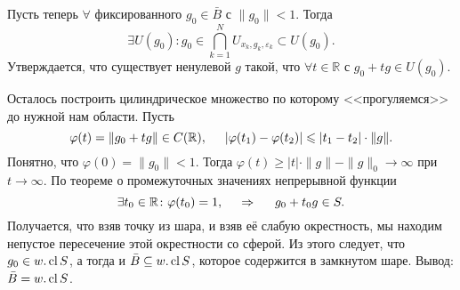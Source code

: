 Пусть теперь $\forall$ фиксированного $g_0 \in \bar{B}$ с $\|g_0\|<1$. Тогда 
\begin{equation*}
    \exists U(g_0) \colon  g_0 \in \bigcap_{k=1}^N U_{x_k, g_k, \varepsilon_k} \subset U(g_0).
\end{equation*}
Утверждается, что существует ненулевой $g$ такой, что $\forall t \in \mathbb{R}$ с $g_0 + t g \in U(g_0)$. 

Осталось построить цилиндрическое множество по которому <<прогуляемся>> до  нужной нам области.  Пусть
\begin{equation*}
    \varphi(t) = \|g_0 + tg\| \in C(\mathbb{R}),
    \hspace{5 mm} 
    |\varphi(t_1) - \varphi(t_2)| \leq |t_1 - t_2|  \cdot \|g\|.
\end{equation*}
Понятно, что $\varphi(0) = \|g_0\| < 1$. Тогда $\varphi(t) \geq |t| \cdot \|g\|-\|g\|_0 \to \infty$ при $t \to \infty$. По теореме о промежуточных значениях непрерывной функции
\begin{equation*}
     \exists t_0 \in \mathbb{R} \colon  \varphi(t_0) = 1,
     \hspace{0.5cm} \Rightarrow \hspace{0.5cm}
     g_0 +t_0 g \in S.
 \end{equation*} 
 Получается, что взяв точку из шара, и взяв её слабую окрестность, мы находим непустое пересечение этой окрестности со сферой. Из этого следует, что $g_0 \in w. \cl S$, а тогда и $\bar{B} \subseteq w. \cl S$, которое содержится в замкнутом шаре. Вывод: $\bar{B} = w. \cl S$. 






